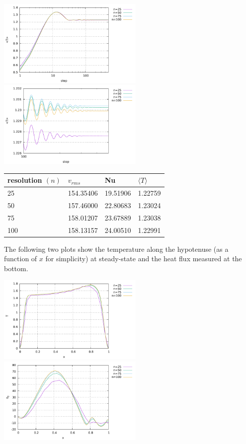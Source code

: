 \begin{center}
\includegraphics[width=7cm]{python_codes/fieldstone_51/images/avrgT_res.pdf}
\includegraphics[width=7cm]{python_codes/fieldstone_51/images/avrgT_res_zoom.pdf}\\
\end{center}

\begin{center}
\begin{tabular}{llll}
\hline
resolution $(n)$ & $v_{rms}$ & Nu & $\langle T \rangle$ \\
\hline
\hline
25  & 154.35406 & 19.51906 &  1.22759\\
50  & 157.46000 & 22.80683 &  1.23024\\
75  & 158.01207 & 23.67889 &  1.23038\\
100 & 158.13157 & 24.00510 &  1.22991\\
\hline
\end{tabular}
\end{center}

The following two plots show the temperature along the hypotenuse (as a function of $x$
for simplicity) at steady-state and the heat flux measured at the bottom. 
\begin{center}
\includegraphics[width=7cm]{python_codes/fieldstone_51/images/temp_hyp_res.pdf}
\includegraphics[width=7cm]{python_codes/fieldstone_51/images/qy_bot_res.pdf}
\end{center}

